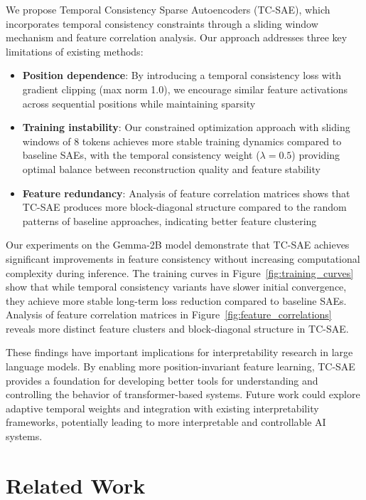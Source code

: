 \documentclass{article} %
\begin{document}
We propose Temporal Consistency Sparse Autoencoders (TC-SAE), which incorporates temporal consistency constraints through a sliding window mechanism and feature correlation analysis. Our approach addresses three key limitations of existing methods:

\begin{itemize}
    \item \textbf{Position dependence}: By introducing a temporal consistency loss with gradient clipping (max norm 1.0), we encourage similar feature activations across sequential positions while maintaining sparsity
    \item \textbf{Training instability}: Our constrained optimization approach with sliding windows of 8 tokens achieves more stable training dynamics compared to baseline SAEs, with the temporal consistency weight ($\lambda=0.5$) providing optimal balance between reconstruction quality and feature stability
    \item \textbf{Feature redundancy}: Analysis of feature correlation matrices shows that TC-SAE produces more block-diagonal structure compared to the random patterns of baseline approaches, indicating better feature clustering
\end{itemize}

Our experiments on the Gemma-2B model demonstrate that TC-SAE achieves significant improvements in feature consistency without increasing computational complexity during inference. The training curves in Figure~\ref{fig:training_curves} show that while temporal consistency variants have slower initial convergence, they achieve more stable long-term loss reduction compared to baseline SAEs. Analysis of feature correlation matrices in Figure~\ref{fig:feature_correlations} reveals more distinct feature clusters and block-diagonal structure in TC-SAE.

These findings have important implications for interpretability research in large language models. By enabling more position-invariant feature learning, TC-SAE provides a foundation for developing better tools for understanding and controlling the behavior of transformer-based systems. Future work could explore adaptive temporal weights and integration with existing interpretability frameworks, potentially leading to more interpretable and controllable AI systems.

\section{Related Work}
\label{sec:related}
\end{document}
